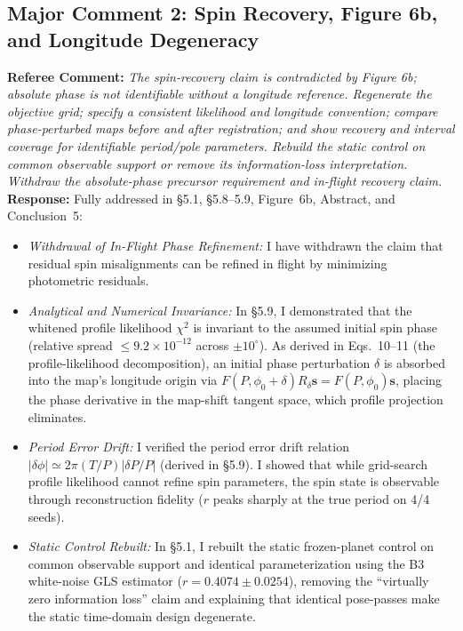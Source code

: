 \documentclass[11pt]{article}
\begin{document}
\subsection*{Major Comment 2: Spin Recovery, Figure 6b, and Longitude Degeneracy}
\textbf{Referee Comment:} \textit{The spin-recovery claim is contradicted by Figure 6b; absolute phase is not identifiable without a longitude reference. Regenerate the objective grid; specify a consistent likelihood and longitude convention; compare phase-perturbed maps before and after registration; and show recovery and interval coverage for identifiable period/pole parameters. Rebuild the static control on common observable support or remove its information-loss interpretation. Withdraw the absolute-phase precursor requirement and in-flight recovery claim.}\\
\textbf{Response:} Fully addressed in §5.1, §5.8--5.9, Figure~6b, Abstract, and Conclusion~5:
\begin{itemize}
    \item \textit{Withdrawal of In-Flight Phase Refinement:} I have withdrawn the claim that residual spin misalignments can be refined in flight by minimizing photometric residuals.
    \item \textit{Analytical and Numerical Invariance:} In §5.9, I demonstrated that the whitened profile likelihood $\chi^2$ is invariant to the assumed initial spin phase (relative spread $\le 9.2\times 10^{-12}$ across $\pm 10^\circ$). As derived in Eqs.~10--11 (the profile-likelihood decomposition), an initial phase perturbation $\delta$ is absorbed into the map's longitude origin via $F(P, \phi_0+\delta)R_\delta \mathbf{s} = F(P, \phi_0)\mathbf{s}$, placing the phase derivative in the map-shift tangent space, which profile projection eliminates.
    \item \textit{Period Error Drift:} I verified the period error drift relation $|\delta\phi| \simeq 2\pi (T/P) |\delta P/P|$ (derived in §5.9). I showed that while grid-search profile likelihood cannot refine spin parameters, the spin state is observable through reconstruction fidelity ($r$ peaks sharply at the true period on 4/4 seeds).
    \item \textit{Static Control Rebuilt:} In §5.1, I rebuilt the static frozen-planet control on common observable support and identical parameterization using the B3 white-noise GLS estimator ($r = 0.4074 \pm 0.0254$), removing the ``virtually zero information loss'' claim and explaining that identical pose-passes make the static time-domain design degenerate.
\end{itemize}
\end{document}

